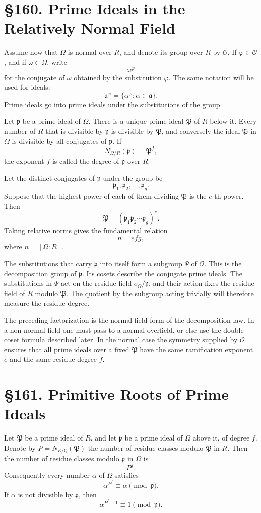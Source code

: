\documentclass[11pt,a4paper]{book}
\newcommand{\webersection}[2]{\clearpage\section*{\S #1. #2}}
\newcommand{\Pgr}{\mathfrak P}
\newcommand{\p}{\mathfrak p}
\newcommand{\aideal}{\mathfrak a}
\begin{document}
\webersection{160}{Prime Ideals in the Relatively Normal Field}

Assume now that \(\Omega\) is normal over \(R\), and denote its group over \(R\) by \(\mathcal O\).  If \(\varphi\in\mathcal O\), and if \(\omega\in\Omega\), write
\[
  \omega^\varphi
\]
for the conjugate of \(\omega\) obtained by the substitution \(\varphi\).  The same notation will be used for ideals:
\[
  \aideal^\varphi=\{\alpha^\varphi:\alpha\in\aideal\}.
\]
Prime ideals go into prime ideals under the substitutions of the group.

Let \(\p\) be a prime ideal of \(\Omega\).  There is a unique prime ideal \(\Pgr\) of \(R\) below it.  Every number of \(R\) that is divisible by \(\p\) is divisible by \(\Pgr\), and conversely the ideal \(\Pgr\) in \(\Omega\) is divisible by all conjugates of \(\p\).  If
\[
  N_{\Omega/R}(\p)=\Pgr^f,
\tag{1}
\]
the exponent \(f\) is called the degree of \(\p\) over \(R\).

Let the distinct conjugates of \(\p\) under the group be
\[
  \p_1,\p_2,\ldots,\p_g.
\]
Suppose that the highest power of each of them dividing \(\Pgr\) is the \(e\)-th power.  Then
\[
  \Pgr=(\p_1\p_2\cdots\p_g)^e.
\tag{2}
\]
Taking relative norms gives the fundamental relation
\[
  n=efg,
\tag{3}
\]
where \(n=[\Omega:R]\).

The substitutions that carry \(\p\) into itself form a subgroup \(\Psi\) of \(\mathcal O\).  This is the decomposition group of \(\p\).  Its cosets describe the conjugate prime ideals.  The substitutions in \(\Psi\) act on the residue field \(o_\Omega/\p\), and their action fixes the residue field of \(R\) modulo \(\Pgr\).  The quotient by the subgroup acting trivially will therefore measure the residue degree.

The preceding factorization is the normal-field form of the decomposition law.  In a non-normal field one must pass to a normal overfield, or else use the double-coset formula described later.  In the normal case the symmetry supplied by \(\mathcal O\) ensures that all prime ideals over a fixed \(\Pgr\) have the same ramification exponent \(e\) and the same residue degree \(f\).

\webersection{161}{Primitive Roots of Prime Ideals}

Let \(\Pgr\) be a prime ideal of \(R\), and let \(\p\) be a prime ideal of \(\Omega\) above it, of degree \(f\).  Denote by \(P=N_{R/\mathbb Q}(\Pgr)\) the number of residue classes modulo \(\Pgr\) in \(R\).  Then the number of residue classes modulo \(\p\) in \(\Omega\) is
\[
  P^f.
\]
Consequently every number \(\alpha\) of \(\Omega\) satisfies
\[
  \alpha^{P^f}\equiv \alpha \pmod{\p}.
\tag{1}
\]
If \(\alpha\) is not divisible by \(\p\), then
\[
  \alpha^{P^f-1}\equiv1\pmod{\p}.
\]
\end{document}
